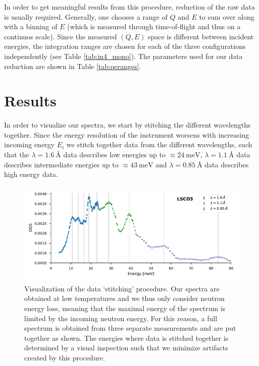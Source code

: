  In order to get meaningful results from this procedure, reduction of the raw data is usually required. Generally, one chooses a range of $Q$ and $E$ to sum over along with a binning of $E$ (which is measured through time-of-flight and thus on a continuos scale). Since the measured $(Q, E)$ space is different between incident energies, the integration  ranges are chosen for each of the three configurations independently (see Table \ref{tab:in4_mono}). The parameters used for our data reduction are shown in Table \ref{tab:qeranges}.
 
\section{Results}
In order to visualize our spectra, we start by stitching the different wavelengths together. Since the energy resolution of the instrument worsens with increasing incoming energy $E_i$ we stitch together data from the different wavelengths, such that the $\lambda = \SI{1.6}{\angstrom}$ data describes low energies up to $\approx \SI{24}{\milli\eV}$, $\lambda = \SI{1.1}{\angstrom}$ data describes intermediate energies up to $\approx \SI{43}{\milli\eV}$ and $\lambda = \SI{0.85}{\angstrom}$ data describes high energy data.

\begin{figure}
    \centering
    \includegraphics[width=\textwidth]{fig/gdos/in4_lsco3_10k.pdf}
    \caption[gDOS of LSCO3 at 10K. Visualize stitching of data.]{Visualization of the data `stitching' procedure. Our spectra are obtained at low temperatures and we thus only consider neutron energy loss, meaning that the maximal energy of the spectrum is limited by the incoming neutron energy. For this reason, a full spectrum is obtained from three separate measurements and are put together as shown. The energies where data is stitched together is determined by a visual inspection such that we minimize artifacts created by this procedure.}
    \label{fig:in4_stitch}
\end{figure}

